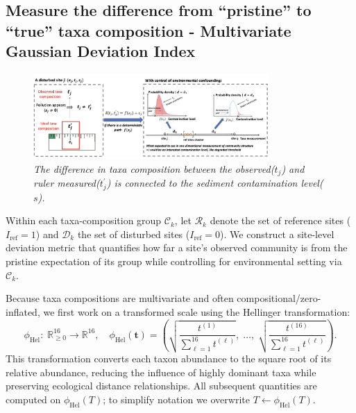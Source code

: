 \subsection{Measure the difference from “pristine” to “true” taxa composition - Multivariate Gaussian Deviation Index }

\begin{figure}[!h]
    \centering
    \includegraphics[width=0.8\textwidth]{../results/ideas_visualization/mark_taxa_difference_and_explain.png}
    \caption{\textit{The difference in taxa composition between the observed($t_{j}$) and ruler measured($t^{'}_{j}$) is connected to the sediment contamination level($s$).}}
    \label{fig:mark_taxa_difference_and_explain}
\end{figure}

Within each taxa-composition group $\mathcal{C}_k$, let $\mathcal{R}_k$ denote the set of reference sites ($I_{\text{ref}}=1$) and $\mathcal{D}_k$ the set of disturbed sites ($I_{\text{ref}}=0$).
We construct a site-level deviation metric that quantifies how far a site's observed community is from the pristine expectation of its group while controlling for environmental setting via $\mathcal{C}_k$.

Because taxa compositions are multivariate and often compositional/zero-inflated, 
we first work on a transformed scale using the Hellinger transformation:
\[
\phi_{\mathrm{Hel}}:\;\mathbb{R}^{16}_{\ge 0}\rightarrow\mathbb{R}^{16}, \quad
\phi_{\mathrm{Hel}}(\mathbf{t})=
\left(
\sqrt{\frac{t^{(1)}}{\sum_{\ell=1}^{16} t^{(\ell)}}},\;
\dots,\;
\sqrt{\frac{t^{(16)}}{\sum_{\ell=1}^{16} t^{(\ell)}}}
\right).
\]
This transformation converts each taxon abundance to the square root of its relative abundance, 
reducing the influence of highly dominant taxa while preserving ecological distance relationships.
All subsequent quantities are computed on $\phi_{\mathrm{Hel}}(T)$; 
to simplify notation we overwrite $T \leftarrow \phi_{\mathrm{Hel}}(T)$.

